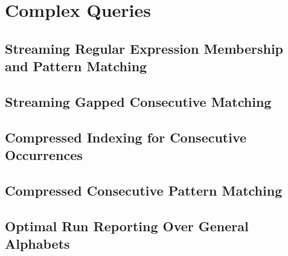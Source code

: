 \part{Complex Queries}\label{part:complex_queries}\mainmatter

\mainmatter
\chapter{Streaming Regular Expression Membership and Pattern Matching}\label{chap:regexp}


\mainmatter
\chapter{Streaming Gapped Consecutive Matching}\label{chap:gapped_stream}

\mainmatter
\chapter[Compressed Indexing for Consecutive Occurrences]{Compressed Indexing for Consecutive\\ Occurrences}\label{chap:gapped_index}


\mainmatter
\chapter{Compressed Consecutive Pattern Matching}\label{chap:gapped_pm}

\mainmatter
\chapter{Optimal Run Reporting Over General Alphabets}\label{chap:squares}

